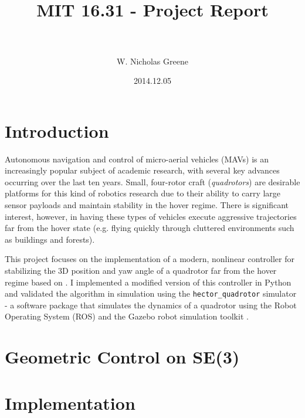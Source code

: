 \documentclass[paper=letter, fontsize=11pt]{scrartcl} %
\title{
\normalfont \normalsize
\horrule{0.5pt} \\[0.4cm] %
\huge MIT 16.31 - Project Report \\ %
\horrule{2pt} \\[0.5cm] %
}
\author{W. Nicholas Greene} %
\date{\normalsize2014.12.05} %
\numberwithin{equation}{section} %
\numberwithin{figure}{section} %
\numberwithin{table}{section} %
\begin{document}
\maketitle %

\section{Introduction}
Autonomous navigation and control of micro-aerial vehicles (MAVs) is an increasingly popular
subject of academic research, with several key advances occurring over the last ten years. 
Small, four-rotor craft (\textit{quadrotors}) are desirable platforms for this kind of 
robotics research due to their ability to carry large sensor payloads and maintain stability 
in the hover regime. There is significant interest, however, in having these types of vehicles 
execute aggressive trajectories far from the hover state (e.g. flying quickly through 
cluttered environments such as buildings and forests).

This project focuses on the implementation of a modern, nonlinear controller for stabilizing the
3D position and yaw angle of a quadrotor far from the hover regime based on \cite{lee2010geometric}. 
I implemented a modified version of this controller in Python and validated the algorithm 
in simulation using the \texttt{hector\_quadrotor} simulator - a software package that simulates the
dynamics of a quadrotor using the Robot Operating System (ROS) and the Gazebo robot
simulation toolkit \cite{2012simpar_meyer, quigley2009ros, koenig2004design}. 

\section{Geometric Control on SE(3)}

\section{Implementation}
\end{document}
